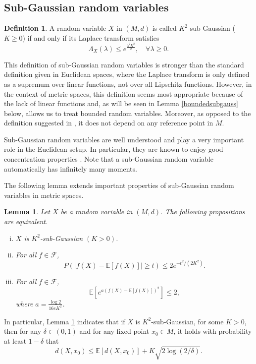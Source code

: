 \documentclass[10pt,a4paper]{article}
\theoremstyle{plain}
\newtheorem{lemma}[theorem]{Lemma}
\theoremstyle{definition}
\newtheorem{definition}[theorem]{Definition}
\theoremstyle{remark}
\newcommand{\E}{\mathbb{E}}
\begin{document}
\subsection{Sub-Gaussian random variables}

\begin{definition}
A random variable $X$ in $(M,d)$ is called $K^2$-sub Gaussian ($K\geq 0$) if and only if its Laplace transform satisfies \begin{equation}\label{defsousgauss}
\Lambda_X(\lambda)\leq e^{\frac{\lambda^2K^2}{2}}, \quad \forall \lambda\geq 0.
\end{equation}
\end{definition}

This definition of sub-Gaussian random variables is stronger than the standard definition given in Euclidean spaces, where the Laplace transform is only defined as a supremum over linear functions, not over all Lipschitz functions. However, in the context of metric spaces, this definition seems most appropriate because of the lack of linear functions and, as will be seen in Lemma \ref{boundedsubgauss} below, allows us to treat bounded random variables. Moreover, as opposed to the definition suggested in \cite{fastconv}, it does not depend on any reference point in $M$.

Sub-Gaussian random variables are well understood and play a very important role in the Euclidean setup. In particular, they are known to enjoy good concentration properties \cite[Section 2.5]{vershynin2018high}. Note that a sub-Gaussian random variable automatically has infinitely many moments.

The following lemma extends important properties of sub-Gaussian random variables in metric spaces.

\begin{lemma}\label{lemmclassiquesousGauss}
Let $X$ be a random variable in $(M,d)$. The following propositions are equivalent.
\begin{enumerate}[(i)]
\item $X$ is $K^2$-sub-Gaussian $(K>0)$.
\item For all $f\in \mathcal F$, 
$$P(|f(X)-\E[f(X)]|\geq t) \leq 2e^{-t^2/(2K^2)}.$$
\item For all $f\in\mathcal F$, 
$$\E[e^{a(f(X)-\E[f(X)])^2}]\leq 2,$$ 
where $a=\frac{\log 2}{16eK^2}$.
\end{enumerate}
\end{lemma}

In particular, Lemma \ref{lemmclassiquesousGauss} indicates that if $X$ is $K^2$-sub-Gaussian, for some $K>0$, then for any $\delta\in (0,1)$ and for any fixed point $x_0\in M$, it holds with probability at least $1-\delta$ that
$$d(X,x_0)\leq \E[d(X,x_0)]+K\sqrt{2\log(2/\delta)}.$$
\end{document}

